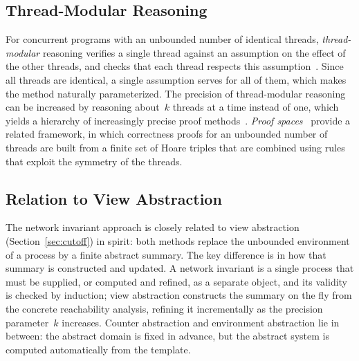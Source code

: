 \subsection{Thread-Modular Reasoning}

For concurrent programs with an unbounded number of identical threads,
\emph{thread-modular} reasoning verifies a single thread against an
assumption on the effect of the other threads, and checks that each thread
respects this assumption~\cite{FQ03}. Since all threads are identical, a
single assumption serves for all of them, which makes the method naturally
parameterized. The precision of thread-modular reasoning can be increased by
reasoning about~$k$ threads at a time instead of one, which yields a hierarchy
of increasingly precise proof methods~\cite{HMP17}. \emph{Proof
spaces}~\cite{FKP15} provide a related framework, in which correctness proofs
for an unbounded number of threads are built from a finite set of Hoare
triples that are combined using rules that exploit the symmetry of the
threads.

\subsection{Relation to View Abstraction}

The network invariant approach is closely related to view abstraction
(Section~\ref{sec:cutoff}) in spirit: both methods replace the unbounded
environment of a process by a finite abstract summary. The key difference is
in how that summary is constructed and updated. A network invariant is a
single process that must be supplied, or computed and refined, as a separate
object, and its validity is checked by induction; view abstraction
constructs the summary on the fly from the concrete reachability analysis,
refining it incrementally as the precision parameter~$k$ increases. Counter
abstraction and environment abstraction lie in between: the abstract domain is
fixed in advance, but the abstract system is computed automatically from the
template.
